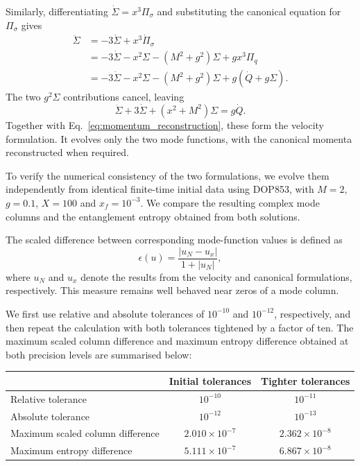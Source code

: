 \documentclass[11pt,a4paper]{article}
\begin{document}
Similarly, differentiating $\dot\Sigma=x^3\Pi_\sigma$
and substituting the canonical equation for $\Pi_\sigma$
gives
\begin{align}
\ddot\Sigma
&=-3\dot\Sigma+x^3\dot\Pi_\sigma\\
&=-3\dot\Sigma-x^2\Sigma-(M^2+g^2)\Sigma
+gx^3\Pi_q\\
&=-3\dot\Sigma-x^2\Sigma-(M^2+g^2)\Sigma
+g(\dot Q+g\Sigma).
\end{align}
The two $g^2\Sigma$ contributions cancel, leaving
\begin{equation}
\boxed{
\ddot\Sigma+3\dot\Sigma+(x^2+M^2)\Sigma=g\dot Q.
}
\end{equation}
Together with Eq.~\eqref{eq:momentum_reconstruction},
these form the velocity formulation. It evolves only the
two mode functions, with the canonical momenta reconstructed
when required.

To verify the numerical consistency of the two formulations,
we evolve them independently from identical finite-time
initial data using DOP853, with $M=2$, $g=0.1$, $X=100$
and $x_f=10^{-3}$. We compare the resulting complex mode
columns and the entanglement entropy obtained from both
solutions.

The scaled difference between corresponding mode-function
values is defined as
\begin{equation}
\epsilon(u)=\frac{|u_N-u_x|}{1+|u_N|},
\end{equation}
where $u_N$ and $u_x$ denote the results from the velocity
and canonical formulations, respectively. This measure
remains well behaved near zeros of a mode column.

We first use relative and absolute tolerances of
$10^{-10}$ and $10^{-12}$, respectively, and then repeat
the calculation with both tolerances tightened by a factor
of ten. The maximum scaled column difference and maximum
entropy difference obtained at both precision levels are
summarised below:

\begin{center}
\begin{tabular}{lcc}
\toprule
 & Initial tolerances & Tighter tolerances\\
\midrule
Relative tolerance & $10^{-10}$ & $10^{-11}$\\
Absolute tolerance & $10^{-12}$ & $10^{-13}$\\
Maximum scaled column difference
& $2.010\times10^{-7}$ & $2.362\times10^{-8}$\\
Maximum entropy difference
& $5.111\times10^{-7}$ & $6.867\times10^{-8}$\\
\bottomrule
\end{tabular}
\end{center}
\end{document}

